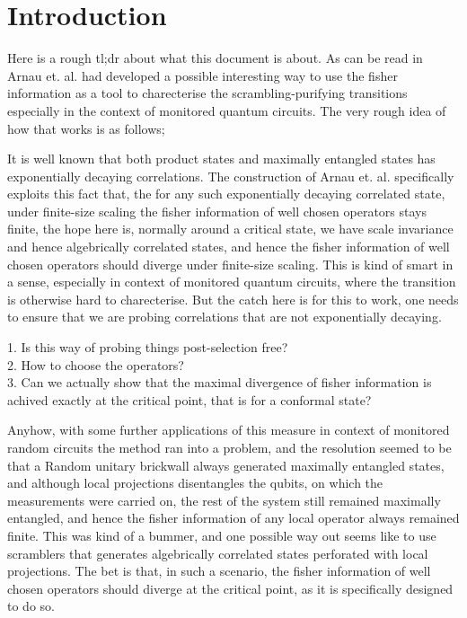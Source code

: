 \section{Introduction}

Here is a rough tl;dr about what this document is about. As can be read in \cite{Arnau2025MultipartiteEntanglementPhysRevLett} Arnau et. al. had developed a possible interesting way to use the fisher information as a tool to charecterise the scrambling-purifying transitions especially in the context of monitored quantum circuits. The very rough idea of how that works is as follows; 

It is well known that both product states and maximally entangled states has exponentially decaying correlations. The construction of Arnau et. al. specifically exploits this fact that, the for any such exponentially decaying correlated state, under finite-size scaling the fisher information of well chosen operators stays finite, the hope here is, normally around a critical state, we have scale invariance and hence algebrically correlated states, and hence the fisher information of well chosen operators should diverge under finite-size scaling. This is kind of smart in a sense, especially in context of monitored quantum circuits, where the transition is otherwise hard to charecterise. But the catch here is for this to work, one needs to ensure that we are probing correlations that are not exponentially decaying.


\begin{notes}[Questions:]
    
1. Is this way of probing things post-selection free?\\
2. How to choose the operators?\\
3. Can we actually show that the maximal divergence of fisher information is achived exactly at the critical point, that is for a conformal state?
\end{notes}

Anyhow, with some further applications of this measure in context of monitored random circuits the method ran into a problem, and the resolution seemed to be that a Random unitary brickwall always generated maximally entangled states, and although local projections disentangles the qubits, on which the measurements were carried on, the rest of the system still remained maximally entangled, and hence the fisher information of any local operator always remained finite. This was kind of a bummer, and one possible way out seems like to use scramblers that generates algebrically correlated states perforated with local projections. The bet is that, in such a scenario, the fisher information of well chosen operators should diverge at the critical point, as it is specifically designed to do so.

